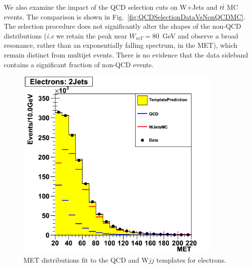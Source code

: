 We also examine the impact of the QCD selection cuts on W+Jets and $t\bar{t}$ MC events. The comparison is shown in Fig.~\ref{fig:QCDSelectionDataVsNonQCDMC}. The selection procedure does not significantly alter the shapes of the non-QCD distributions ({\it i.e} we retain the peak near $W_{mT}=$80~GeV and observe a broad resonance, rather than an exponentially falling spectrum, in the MET), which remain distinct from multijet events. There is no evidence that the data sideband contains a significant fraction of non-QCD events. 


\begin{figure}[h!] {\centering
{}\linewidth
\includegraphics[width=0.90\textwidth]{figs/qcd/TemplateFit19p2fbQCD_MET_el2j.png}
\caption{MET distributions fit to the QCD and W$jj$ templates for electrons.}
\label{fig:QCDTemplateFit_MET}
}
\end{figure}
